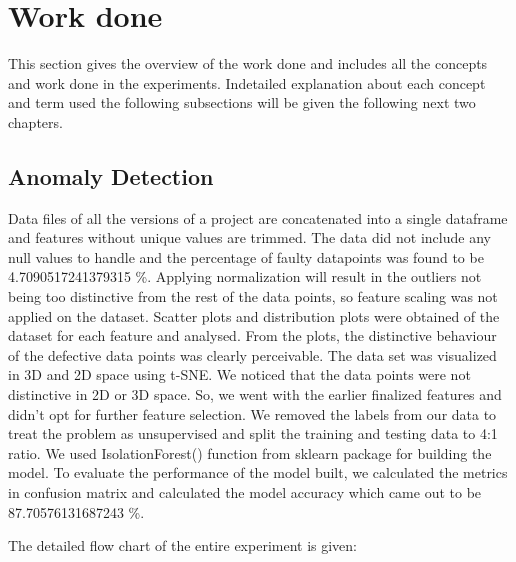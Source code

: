 \section{Work done}\label{sec2.3}

This section gives the overview of the work done and includes all the concepts and work done in the experiments. Indetailed explanation about each concept and term used the following subsections will be given the following next two chapters. 

\subsection{Anomaly Detection}
Data files of all the versions of a project are concatenated into a single dataframe and features without unique values are trimmed. The data did not include any null values to handle and the percentage of faulty datapoints was found to be 4.7090517241379315 \%. Applying normalization will result in the outliers not being too distinctive from the rest of the data points, so feature scaling was not applied on the dataset. Scatter plots and distribution plots were obtained of the dataset for each feature and analysed. From the plots, the distinctive behaviour of the defective data points was clearly perceivable. The data set was visualized in 3D and 2D space using t-SNE. We noticed that the data points were not distinctive in 2D or 3D space. So, we went with the earlier finalized features and didn't opt for further feature selection. We removed the labels from our data to treat the problem as unsupervised and split the training and testing data to 4:1 ratio. We used IsolationForest() function from sklearn package for building the model. To evaluate the performance of the model built, we calculated the metrics in confusion matrix and calculated the model accuracy which came out to be 87.70576131687243 \%. 

The detailed flow chart 
of the entire experiment is
given:

